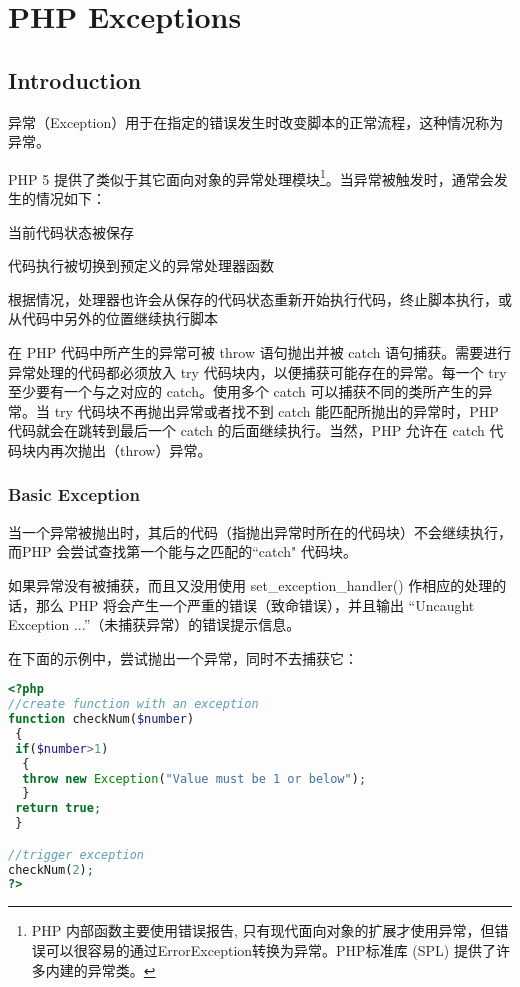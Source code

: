 \part{PHP Exceptions}




\chapter{Introduction}

异常（Exception）用于在指定的错误发生时改变脚本的正常流程，这种情况称为异常。

PHP 5 提供了类似于其它面向对象的异常处理模块\footnote{PHP 内部函数主要使用错误报告, 只有现代面向对象的扩展才使用异常，但错误可以很容易的通过ErrorException转换为异常。PHP标准库 (SPL) 提供了许多内建的异常类。}。当异常被触发时，通常会发生的情况如下：

\begin{compactitem}
\item 当前代码状态被保存
\item 代码执行被切换到预定义的异常处理器函数
\item 根据情况，处理器也许会从保存的代码状态重新开始执行代码，终止脚本执行，或从代码中另外的位置继续执行脚本
\end{compactitem}

在 PHP 代码中所产生的异常可被 throw 语句抛出并被 catch 语句捕获。需要进行异常处理的代码都必须放入 try 代码块内，以便捕获可能存在的异常。每一个 try 至少要有一个与之对应的 catch。使用多个 catch 可以捕获不同的类所产生的异常。当 try 代码块不再抛出异常或者找不到 catch 能匹配所抛出的异常时，PHP 代码就会在跳转到最后一个 catch 的后面继续执行。当然，PHP 允许在 catch 代码块内再次抛出（throw）异常。


\section{Basic Exception}


当一个异常被抛出时，其后的代码（指抛出异常时所在的代码块）不会继续执行，而PHP 会尝试查找第一个能与之匹配的``catch" 代码块。

如果异常没有被捕获，而且又没用使用 set\_exception\_handler() 作相应的处理的话，那么 PHP 将会产生一个严重的错误（致命错误），并且输出 ``Uncaught Exception ...''（未捕获异常）的错误提示信息。



在下面的示例中，尝试抛出一个异常，同时不去捕获它：


\begin{lstlisting}[language=PHP]
<?php
//create function with an exception
function checkNum($number)
 {
 if($number>1)
  {
  throw new Exception("Value must be 1 or below");
  }
 return true;
 }

//trigger exception
checkNum(2);
?>
\end{lstlisting}

